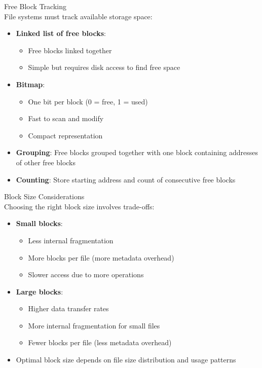 \begin{definition}{Free Block Tracking}\\
    File systems must track available storage space:
    \begin{itemize}
        \item \textbf{Linked list of free blocks}:
            \begin{itemize}
                \item Free blocks linked together
                \item Simple but requires disk access to find free space
            \end{itemize}
        \item \textbf{Bitmap}:
            \begin{itemize}
                \item One bit per block (0 = free, 1 = used)
                \item Fast to scan and modify
                \item Compact representation
            \end{itemize}
        \item \textbf{Grouping}: Free blocks grouped together with one block containing addresses of other free blocks
        \item \textbf{Counting}: Store starting address and count of consecutive free blocks
    \end{itemize}
\end{definition}

\begin{definition}{Block Size Considerations}\\
    Choosing the right block size involves trade-offs:
    \begin{itemize}
        \item \textbf{Small blocks}:
            \begin{itemize}
                \item Less internal fragmentation
                \item More blocks per file (more metadata overhead)
                \item Slower access due to more operations
            \end{itemize}
        \item \textbf{Large blocks}:
            \begin{itemize}
                \item Higher data transfer rates
                \item More internal fragmentation for small files
                \item Fewer blocks per file (less metadata overhead)
            \end{itemize}
        \item Optimal block size depends on file size distribution and usage patterns
    \end{itemize}
\end{definition}

